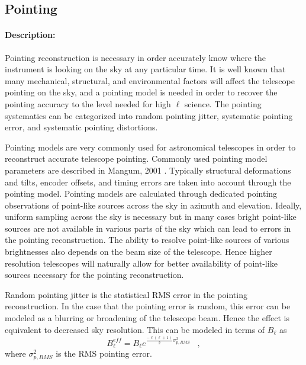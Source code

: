 \subsection{Pointing}

\paragraph{Description:}
Pointing reconstruction is necessary in order accurately know where the instrument is looking on the sky at any particular time. It is well known that many mechanical, structural, and environmental factors will affect the telescope pointing on the sky, and a pointing model is needed in order to recover the pointing accuracy to the level needed for high $\ell$ science. The pointing systematics can be categorized into random pointing jitter, systematic pointing error, and systematic pointing distortions.

Pointing models are very commonly used for astronomical telescopes in order to reconstruct accurate telescope pointing. Commonly used pointing model parameters are described in Mangum, 2001 \cite{Mangum2001}. Typically structural deformations and tilts, encoder offsets, and timing errors are taken into account through the pointing model. Pointing models are calculated through dedicated pointing observations of point-like sources across the sky in azimuth and elevation. Ideally, uniform sampling across the sky is necessary but in many cases bright point-like sources are not available in various parts of the sky which can lead to errors in the pointing reconstruction. The ability to resolve point-like sources of various brightnesses also depends on the beam size of the telescope. Hence higher resolution telescopes will naturally allow for better availability of point-like sources necessary for the pointing reconstruction.

Random pointing jitter is the statistical RMS error in the pointing reconstruction. In the case that the pointing error is random, this error can be modeled as a blurring or broadening of the telescope beam. Hence the effect is equivalent to decreased sky resolution. This can be modeled in terms of $B_{\ell}$ as
\begin{equation}
B_{\ell}^{eff} = B_{\ell} e^{\frac{-\ell(\ell+1)}{2} \sigma^{2}_{p,RMS}}  \,\,\,\,\, ,
\end{equation}
where $\sigma^{2}_{p,RMS}$ is the RMS pointing error. 

